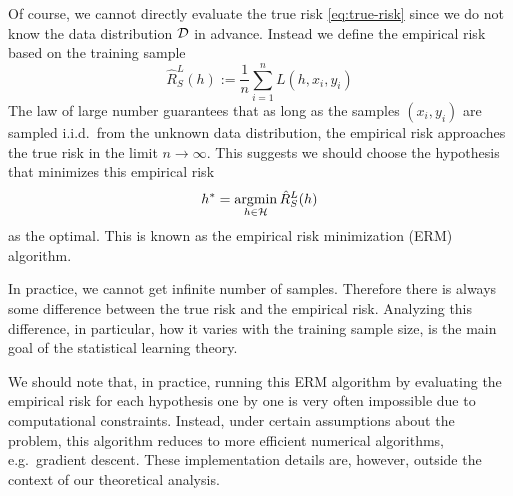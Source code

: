Of course, we cannot directly evaluate the true risk \eqref{eq:true-risk} since
we do not know the data distribution $\mathcal{D}$ in advance. Instead we define the
empirical risk based on the training sample
\begin{equation}
  \label{eq:empiricial-risk}
  \hat{R}_S^L(h) := \frac{1}{n} \sum_{i = 1}^n L(h, x_i, y_i)
\end{equation}
The law of large number guarantees that as long as the samples $(x_i, y_i)$ are
sampled i.i.d.\ from the unknown data distribution, the empirical risk
approaches the true risk in the limit $n \to \infty$. This suggests we should
choose the hypothesis that minimizes this empirical risk
\begin{equation}
  \label{eq:erm}
  h^* = \operatorname*{argmin}_{h \in \mathcal{H}} \hat{R}_S^L(h)
\end{equation}
as the optimal. This is known as the empirical risk minimization (ERM)
algorithm.

In practice, we cannot get infinite number of samples. Therefore there is always
some difference between the true risk and the empirical risk. Analyzing this
difference, in particular, how it varies with the training sample size, is the
main goal of the statistical learning theory.

\begin{remark}
  We should note that, in practice, running this ERM algorithm by evaluating the
  empirical risk for each hypothesis one by one is very often impossible due to
  computational constraints. Instead, under certain assumptions about the
  problem, this algorithm reduces to more efficient numerical algorithms, e.g.\
  gradient descent. These implementation details are, however, outside the
  context of our theoretical analysis.
\end{remark}

